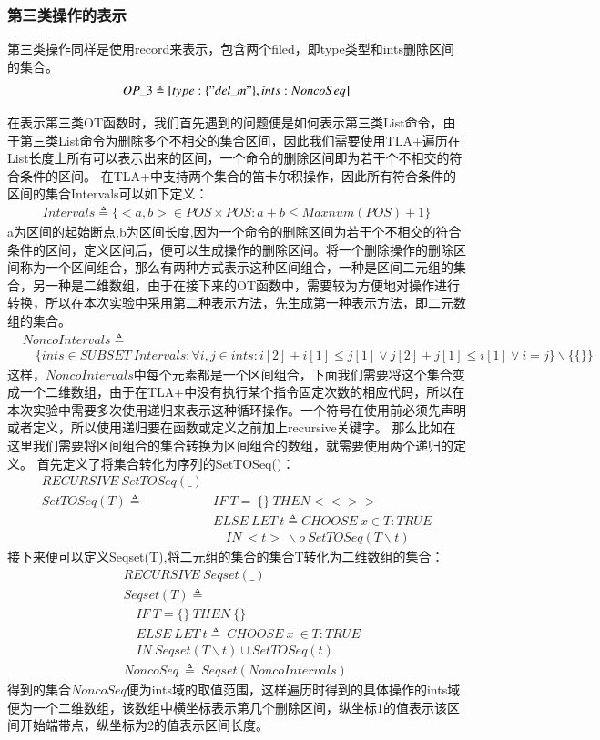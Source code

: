 \subsubsection{第三类操作的表示}
第三类操作同样是使用record来表示，包含两个filed，即type类型和ints删除区间的集合。
\begin{align*}
OP\_3 \triangleq [type:\{"del\_m"\},ints:NoncoSeq] 
\end{align*}

在表示第三类OT函数时，我们首先遇到的问题便是如何表示第三类List命令，由于第三类List命令为删除多个不相交的集合区间，因此我们需要使用TLA+遍历在List长度上所有可以表示出来的区间，一个命令的删除区间即为若干个不相交的符合条件的区间。
在TLA+中支持两个集合的笛卡尔积操作，因此所有符合条件的区间的集合Intervals可以如下定义：
\begin{align*}
Intervals \triangleq \{<a,b> \in POS \times POS: a+b \le Maxnum(POS)+1 \}
\end{align*}
a为区间的起始断点,b为区间长度,因为一个命令的删除区间为若干个不相交的符合条件的区间，定义区间后，便可以生成操作的删除区间。将一个删除操作的删除区间称为一个区间组合，那么有两种方式表示这种区间组合，一种是区间二元组的集合，另一种是二维数组，由于在接下来的OT函数中，需要较为方便地对操作进行转换，所以在本次实验中采用第二种表示方法，先生成第一种表示方法，即二元数组的集合。
\begin{align*}
& NoncoIntervals \triangleq \\ 
& \quad \{ints \in SUBSET \ Intervals : \forall i,j \in ints: i[2]+i[1] \le j[1] \lor j[2]+j[1] \le i[1] \lor i=j\} \backslash \{\{\}\}
\end{align*}
这样，$NoncoIntervals$中每个元素都是一个区间组合，下面我们需要将这个集合变成一个二维数组，由于在TLA+中没有执行某个指令固定次数的相应代码，所以在本次实验中需要多次使用递归来表示这种循环操作。一个符号在使用前必须先声明或者定义，所以使用递归要在函数或定义之前加上recursive关键字。
那么比如在这里我们需要将区间组合的集合转换为区间组合的数组，就需要使用两个递归的定义。
首先定义了将集合转化为序列的SetTOSeq()：
\begin{align*}
RECURSIVE\ SetTOSeq(\_)\\
SetTOSeq(T) \triangleq &IF\ T =\ \{\}\ THEN <<>>\\
                       & ELSE\ LET\ t \triangleq CHOOSE\ x \in T : TRUE\\
                        & \quad IN\ <t>\ \backslash o\ SetTOSeq(T \backslash {t})
\end{align*}
接下来便可以定义Seqset(T),将二元组的集合的集合T转化为二维数组的集合：
\begin{align*}
&RECURSIVE\ Seqset(\_)\\
&Seqset(T) \triangleq  \\
& \quad IF\ T = \{\}\ THEN\ \{\}\\
& \quad ELSE\ LET\ t\triangleq\ CHOOSE\ x\ \in T : TRUE\\
& \quad IN\ Seqset(T \backslash {t}) \cup {SetTOSeq(t)} \\
&NoncoSeq\ \triangleq\ Seqset(NoncoIntervals)
\end{align*}
得到的集合$NoncoSeq$便为ints域的取值范围，这样遍历时得到的具体操作的ints域便为一个二维数组，该数组中横坐标表示第几个删除区间，纵坐标1的值表示该区间开始端带点，纵坐标为2的值表示区间长度。

